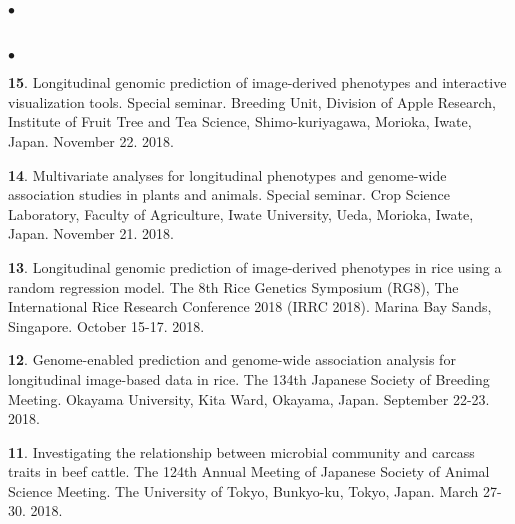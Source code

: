 \documentclass[margin,line,10pt]{res}
\newenvironment{list2}{
  \begin{list}{$\bullet$}{%
      \setlength{\itemsep}{0in}
      \setlength{\parsep}{0in} \setlength{\parskip}{0in}
      \setlength{\topsep}{0in} \setlength{\partopsep}{0in} 
      \setlength{\leftmargin}{0.2in}}}{\end{list}}
\begin{document}
\begin{resume}
\begin{list2}
\end{list2}  



\section{}
\begin{list2}

\item [{\bf 15}.] Longitudinal genomic prediction of image-derived phenotypes and interactive visualization tools. Special seminar. Breeding Unit, Division of Apple Research, Institute of Fruit Tree and Tea Science, Shimo-kuriyagawa, Morioka, Iwate, Japan. November 22. 2018.
  
  \vspace{0.5cm}
  
\item [{\bf 14}.] Multivariate analyses for longitudinal phenotypes and genome-wide association studies in plants and animals. Special seminar. Crop Science Laboratory, Faculty of Agriculture, Iwate University, Ueda, Morioka, Iwate, Japan. November 21. 2018.
  
  \vspace{0.5cm}

\item [{\bf 13}.] Longitudinal genomic prediction of image-derived phenotypes in rice using a random regression model. The 8th Rice Genetics Symposium (RG8), The International Rice Research Conference 2018 (IRRC 2018). Marina Bay Sands, Singapore. October 15-17. 2018.
  
  \vspace{0.5cm}
  
\item [{\bf 12}.] Genome-enabled prediction and genome-wide association analysis for longitudinal image-based data in rice. The 134th Japanese Society of Breeding Meeting. Okayama University, Kita Ward, Okayama, Japan. September 22-23. 2018.
  
  \vspace{0.5cm}

  
  \item [{\bf 11}.] Investigating the relationship between microbial community and carcass traits in beef cattle.  The 124th Annual Meeting of Japanese Society of Animal Science Meeting.  The University of Tokyo, Bunkyo-ku, Tokyo, Japan. March 27-30. 2018.

    
    \vspace{0.5cm}


\end{list2}
\end{resume}
\end{document}
